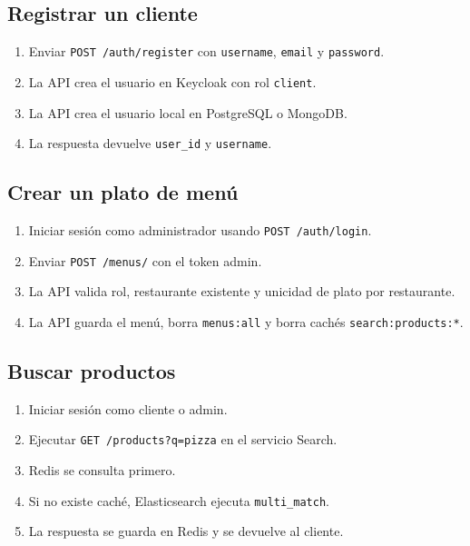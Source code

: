 \documentclass[12pt,letterpaper]{article}
\def\endpoint#1#2{\texttt{#1 #2}}
\def\codefile#1{\nolinkurl{#1}}
\begin{document}
\subsection{Registrar un cliente}

\begin{enumerate}
    \item Enviar \endpoint{POST}{/auth/register} con \codefile{username}, \codefile{email} y \codefile{password}.
    \item La API crea el usuario en Keycloak con rol \codefile{client}.
    \item La API crea el usuario local en PostgreSQL o MongoDB.
    \item La respuesta devuelve \codefile{user\_id} y \codefile{username}.
\end{enumerate}

\subsection{Crear un plato de menú}

\begin{enumerate}
    \item Iniciar sesión como administrador usando \endpoint{POST}{/auth/login}.
    \item Enviar \endpoint{POST}{/menus/} con el token admin.
    \item La API valida rol, restaurante existente y unicidad de plato por restaurante.
    \item La API guarda el menú, borra \codefile{menus:all} y borra cachés \codefile{search:products:*}.
\end{enumerate}

\subsection{Buscar productos}

\begin{enumerate}
    \item Iniciar sesión como cliente o admin.
    \item Ejecutar \endpoint{GET}{/products?q=pizza} en el servicio Search.
    \item Redis se consulta primero.
    \item Si no existe caché, Elasticsearch ejecuta \codefile{multi\_match}.
    \item La respuesta se guarda en Redis y se devuelve al cliente.
\end{enumerate}
\end{document}
